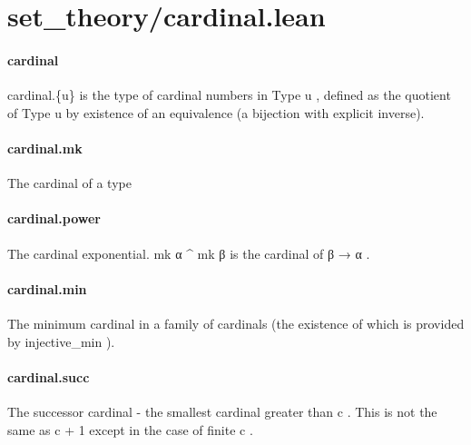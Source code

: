 \documentclass{article}
\begin{document}
\section{set\_theory/cardinal.lean}\paragraph{cardinal}
\par
\colorbox[RGB]{253,246,227}{{{{\color[RGB]{101, 123, 131} cardinal.\{u\} }}}} is the type of cardinal numbers in 
\colorbox[RGB]{253,246,227}{{{{\color[RGB]{38, 139, 210} Type }}}{{{\color[RGB]{101, 123, 131}  u }}}},
defined as the quotient of 
\colorbox[RGB]{253,246,227}{{{{\color[RGB]{38, 139, 210} Type }}}{{{\color[RGB]{101, 123, 131}  u }}}} by existence of an equivalence
(a bijection with explicit inverse).
\paragraph{cardinal.mk}
\par
The cardinal of a type
\paragraph{cardinal.power}
\par
The cardinal exponential. 
\colorbox[RGB]{253,246,227}{{{{\color[RGB]{101, 123, 131} mk α \textasciicircum{} mk β }}}} is the cardinal of 
\colorbox[RGB]{253,246,227}{{{{\color[RGB]{101, 123, 131} β  }}}{{{\color[RGB]{133, 153, 0} → }}}{{{\color[RGB]{101, 123, 131}  α }}}}.
\paragraph{cardinal.min}
\par
The minimum cardinal in a family of cardinals (the existence
of which is provided by 
\colorbox[RGB]{253,246,227}{{{{\color[RGB]{101, 123, 131} injective\_min }}}}).
\paragraph{cardinal.succ}
\par
The successor cardinal - the smallest cardinal greater than
\colorbox[RGB]{253,246,227}{{{{\color[RGB]{101, 123, 131} c }}}}. This is not the same as 
\colorbox[RGB]{253,246,227}{{{{\color[RGB]{101, 123, 131} c  }}}{{{\color[RGB]{181, 137, 0} + }}}{{{\color[RGB]{101, 123, 131}   }}}{{{\color[RGB]{108, 113, 196} 1 }}}} except in the case of finite 
\colorbox[RGB]{253,246,227}{{{{\color[RGB]{101, 123, 131} c }}}}.
\end{document}
